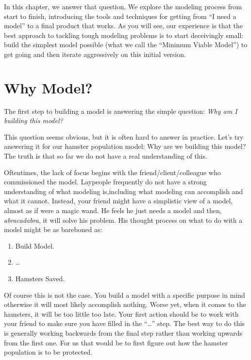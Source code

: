 \documentclass[]{memoir}
\begin{document}
In this chapter, we answer that question. We explore the modeling
process from start to finish, introducing the tools and techniques for
getting from ``I need a model'' to a final product that works. As you
will see, our experience is that the best approach to tackling tough
modeling problems is to start deceivingly small: build the simplest
model possible (what we call the ``Minimum Viable Model'') to get going
and then iterate aggressively on this initial version.

\section{Why Model?}

The first step to building a model is answering the simple question:
\emph{Why am I building this model?}

This question seems obvious, but it is often hard to answer in practice.
Let's try answering it for our hamster population model: Why are we
building this model? The truth is that so far we do not have a real
understanding of this.

Oftentimes, the lack of focus begins with the friend/client/colleague
who commissioned the model. Laypeople frequently do not have a strong
understanding of what modeling is,including what modeling can accomplish
and what it cannot. Instead, your friend might have a simplistic view of
a model, almost as if were a magic wand. He feels he just needs a model
and then, \emph{abracadabra}, it will solve his problem. His thought
process on what to do with a model might be as bareboned as:

\begin{enumerate}
\def\labelenumi{\arabic{enumi}.}
\itemsep1pt\parskip0pt
\item
  Build Model.
\item
  \ldots{}
\item
  Hamsters Saved.
\end{enumerate}

Of course this is not the case. You build a model with a specific
purpose in mind otherwise it will most likely accomplish nothing. Worse
yet, when it comes to the hamsters, it will be too little too late. Your
first action should be to work with your friend to make sure you have
filled in the ``\ldots{}'' step. The best way to do this is generally
working backwards from the final step rather than working upwards from
the first one. For us that would be to first figure out how the hamster
population is to be protected.
\end{document}
